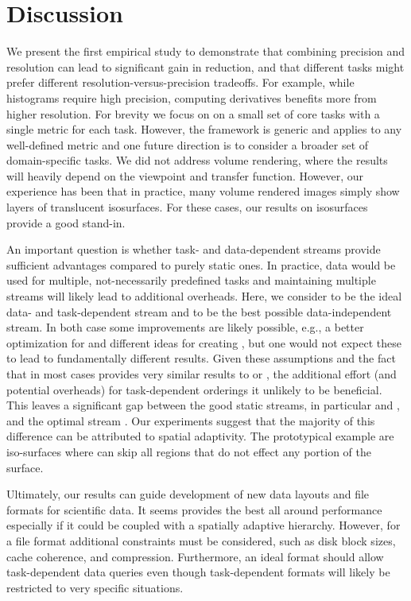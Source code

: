 \section{Discussion}

We present the first empirical study to demonstrate that combining precision and resolution can lead
to significant gain in reduction, and that different tasks might prefer different
resolution-versus-precision tradeoffs. For example, while histograms require high precision,
computing derivatives benefits more from higher resolution. For brevity we focus on on a small set
of core tasks with a single metric for each task. However, the framework is generic and applies to
any well-defined metric and one future direction is to consider a broader set of domain-specific
tasks. We did not address volume rendering, where the results will heavily depend on the viewpoint
and transfer function. However, our experience has been that in practice, many volume rendered
images simply show layers of translucent isosurfaces. For these cases, our results on isosurfaces
provide a good stand-in.

An important question is whether task- and data-dependent streams provide sufficient advantages
compared to purely static ones. In practice, data would be used for multiple, not-necessarily
predefined tasks and maintaining multiple streams will likely lead to additional overheads. Here, we
consider \sopt to be the ideal data- and task-dependent stream and \ssig to be the best possible
data-independent stream. In both case some improvements are likely possible, e.g., a better
optimization for \sopt and different ideas for creating \ssig, but one would not expect these to
lead to fundamentally different results. Given these assumptions and the fact that \ssig in most
cases provides very similar results to \sbit or \swav, the additional effort (and potential
overheads) for task-dependent orderings it unlikely to be beneficial. This leaves a significant gap
between the good static streams, in particular \swav and \sbit, and the optimal stream \sopt. Our
experiments suggest that the majority of this difference can be attributed to spatial adaptivity.
The prototypical example are iso-surfaces where \sopt can skip all regions that do not effect any
portion of the surface.

Ultimately, our results can guide development of new data layouts and file formats for scientific
data. It seems \swav provides the best all around performance especially if it could be coupled with
a spatially adaptive hierarchy. However, for a file format additional constraints must be
considered, such as disk block sizes, cache coherence, and compression. Furthermore, an ideal format
should allow task-dependent data queries even though task-dependent formats will likely be
restricted to very specific situations. 

